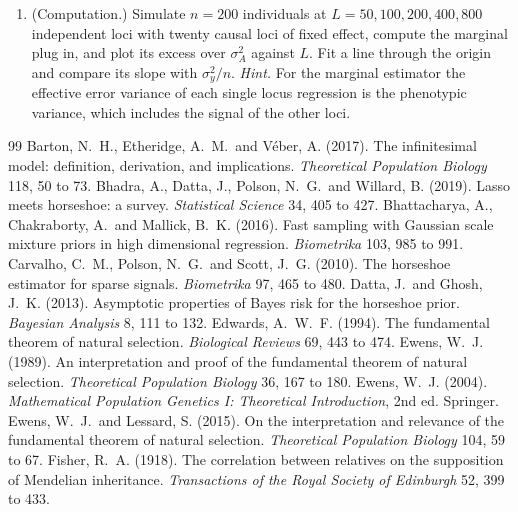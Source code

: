\begin{enumerate}[label=\arabic*.,leftmargin=*,itemsep=4pt]
\item (Computation.) Simulate $n = 200$ individuals at $L = 50, 100, 200, 400, 800$ independent loci with twenty causal loci of fixed effect, compute the marginal plug in, and plot its excess over $\sigma^2_A$ against $L$. Fit a line through the origin and compare its slope with $\sigma^2_y/n$.
\emph{Hint.} For the marginal estimator the effective error variance of each single locus regression is the phenotypic variance, which includes the signal of the other loci.
\end{enumerate}

\begin{small}
\setlength{\bibsep}{0.6pt}
\begin{thebibliography}{99}
\footnotesize
{} Barton, N.\ H., Etheridge, A.\ M.\ and V\'eber, A. (2017). The infinitesimal model: definition, derivation, and implications. \emph{Theoretical Population Biology} 118, 50 to 73.
 Bhadra, A., Datta, J., Polson, N.\ G.\ and Willard, B. (2019). Lasso meets horseshoe: a survey. \emph{Statistical Science} 34, 405 to 427.
 Bhattacharya, A., Chakraborty, A.\ and Mallick, B.\ K. (2016). Fast sampling with Gaussian scale mixture priors in high dimensional regression. \emph{Biometrika} 103, 985 to 991.
 Carvalho, C.\ M., Polson, N.\ G.\ and Scott, J.\ G. (2010). The horseshoe estimator for sparse signals. \emph{Biometrika} 97, 465 to 480.
 Datta, J.\ and Ghosh, J.\ K. (2013). Asymptotic properties of Bayes risk for the horseshoe prior. \emph{Bayesian Analysis} 8, 111 to 132.
 Edwards, A.\ W.\ F. (1994). The fundamental theorem of natural selection. \emph{Biological Reviews} 69, 443 to 474.
 Ewens, W.\ J. (1989). An interpretation and proof of the fundamental theorem of natural selection. \emph{Theoretical Population Biology} 36, 167 to 180.
 Ewens, W.\ J. (2004). \emph{Mathematical Population Genetics I: Theoretical Introduction}, 2nd ed. Springer.
 Ewens, W.\ J.\ and Lessard, S. (2015). On the interpretation and relevance of the fundamental theorem of natural selection. \emph{Theoretical Population Biology} 104, 59 to 67.
 Fisher, R.\ A. (1918). The correlation between relatives on the supposition of Mendelian inheritance. \emph{Transactions of the Royal Society of Edinburgh} 52, 399 to 433.

\end{thebibliography}
\end{small}
